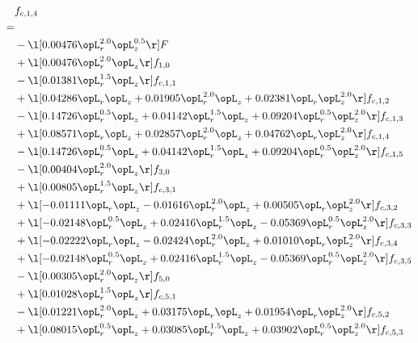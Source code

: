 \begin{alignat}{2} 
\label{eq:f_14_1} 
& f_{c,1,4} \nonumber \\ 
 = \\ 
& - \l[  0.00476 \opL_r^{2.0} \opL_z^{0.5}  \r] F \nonumber \\ 
& + \l[  0.00476 \opL_r^{2.0} \opL_z  \r] f_{1,0} \nonumber \\ 
& - \l[  0.01381 \opL_r^{1.5} \opL_z  \r] f_{c,1,1} \nonumber \\ 
& + \l[  0.04286 \opL_r \opL_z +  0.01905 \opL_r^{2.0} \opL_z +  0.02381 \opL_r \opL_z^{2.0}  \r] f_{c,1,2} \nonumber \\ 
& - \l[  0.14726 \opL_r^{0.5} \opL_z +  0.04142 \opL_r^{1.5} \opL_z +  0.09204 \opL_r^{0.5} \opL_z^{2.0}  \r] f_{c,1,3} \nonumber \\ 
& + \l[  0.08571 \opL_r \opL_z +  0.02857 \opL_r^{2.0} \opL_z +  0.04762 \opL_r \opL_z^{2.0}  \r] f_{c,1,4} \nonumber \\ 
& - \l[  0.14726 \opL_r^{0.5} \opL_z +  0.04142 \opL_r^{1.5} \opL_z +  0.09204 \opL_r^{0.5} \opL_z^{2.0}  \r] f_{c,1,5} \nonumber \\ 
& - \l[  0.00404 \opL_r^{2.0} \opL_z  \r] f_{3,0} \nonumber \\ 
& + \l[  0.00805 \opL_r^{1.5} \opL_z  \r] f_{c,3,1} \nonumber \\ 
& + \l[  -0.01111 \opL_r \opL_z   -0.01616 \opL_r^{2.0} \opL_z +  0.00505 \opL_r \opL_z^{2.0}  \r] f_{c,3,2} \nonumber \\ 
& + \l[  -0.02148 \opL_r^{0.5} \opL_z +  0.02416 \opL_r^{1.5} \opL_z   -0.05369 \opL_r^{0.5} \opL_z^{2.0}  \r] f_{c,3,3} \nonumber \\ 
& + \l[  -0.02222 \opL_r \opL_z   -0.02424 \opL_r^{2.0} \opL_z +  0.01010 \opL_r \opL_z^{2.0}  \r] f_{c,3,4} \nonumber \\ 
& + \l[  -0.02148 \opL_r^{0.5} \opL_z +  0.02416 \opL_r^{1.5} \opL_z   -0.05369 \opL_r^{0.5} \opL_z^{2.0}  \r] f_{c,3,5} \nonumber \\ 
& - \l[  0.00305 \opL_r^{2.0} \opL_z  \r] f_{5,0} \nonumber \\ 
& + \l[  0.01028 \opL_r^{1.5} \opL_z  \r] f_{c,5,1} \nonumber \\ 
& - \l[  0.01221 \opL_r^{2.0} \opL_z +  0.03175 \opL_r \opL_z +  0.01954 \opL_r \opL_z^{2.0}  \r] f_{c,5,2} \nonumber \\ 
& + \l[  0.08015 \opL_r^{0.5} \opL_z +  0.03085 \opL_r^{1.5} \opL_z +  0.03902 \opL_r^{0.5} \opL_z^{2.0}  \r] f_{c,5,3} \nonumber \\ 

\end{alignat}
